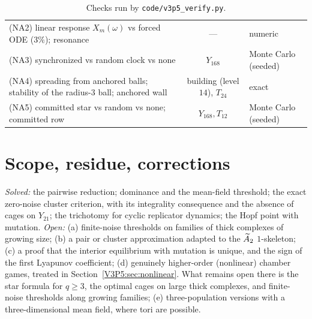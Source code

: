 \begin{table}[ht]
{\begin{tabular}{lcl}
(NA2) linear response $X_m(\omega)$ vs forced ODE ($3\%$); resonance & --- & numeric\\
(NA3) synchronized vs random clock vs none & $Y_{168}$ & Monte Carlo (seeded)\\
(NA4) spreading from anchored balls; stability of the radius-$3$ ball; anchored wall & building (level $14$), $T_{24}$ & exact\\
(NA5) committed star vs random vs none; committed row & $Y_{168},T_{12}$ & Monte Carlo (seeded)\\
\bottomrule
\end{tabular}}
\medskip
\caption{Checks run by \texttt{code/v3p5\_verify.py}.}
\label{V3P5:tab:battery}
\end{table}

\section{Scope, residue, corrections}\label{V3P5:sec:scope}

\begin{remark}\label{V3P5:rem:scope}
\emph{Solved:} the pairwise reduction; dominance and the mean-field threshold; the exact
zero-noise cluster criterion, with its integrality consequence and the absence of cages on
$Y_{21}$; the trichotomy for cyclic replicator dynamics; the Hopf point with mutation.
\emph{Open:} (a) finite-noise thresholds on families of thick complexes of growing size; (b) a
pair or cluster approximation adapted to the $\widetilde A_2$ $1$-skeleton; (c) a proof that the
interior equilibrium with mutation is unique, and the sign of the first Lyapunov coefficient;
(d) genuinely higher-order (nonlinear) chamber games, treated in
Section~\ref{V3P5:sec:nonlinear}. What remains open there is the star formula for $q\ge3$, the
optimal cages on large thick complexes, and finite-noise thresholds along growing families;
(e) three-population versions with a three-dimensional mean field, where tori are possible.
\end{remark}

